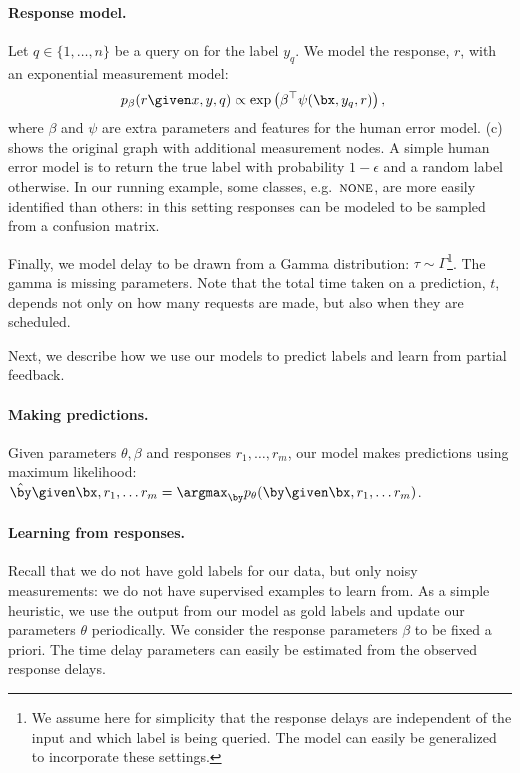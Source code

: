 \paragraph{Response model.}
Let $q \in \{1, \ldots, n\}$ be a query on for the label $y_q$.
We model the response, $r$, with an exponential measurement model:
\begin{align*}
  p_\beta(r \given x, y, q) 
  &\propto \exp \left( \beta^\top\psi(\bx, y_q, r) \right),
\end{align*}
where $\beta$ and $\psi$ are extra parameters and features for the human error model. 
(c) shows the original graph with additional measurement nodes.
A simple human error model is to return the true label with probability $1-\epsilon$ and a random label otherwise.
In our running example, some classes, e.g.\ $\textsc{none}$, are more easily identified than others: in this setting responses can be modeled to be sampled from a confusion matrix.

Finally, we model delay to be drawn from a Gamma distribution: $\tau \sim \Gamma$\footnote{We assume here for simplicity that the response delays are independent of the input and which label is being queried. The model can easily be generalized to incorporate these settings.}.
\ac{The gamma is missing parameters.}
Note that the total time taken on a prediction, $t$, depends not only on how many requests are made, but also when they are scheduled.

Next, we describe how we use our models to predict labels and learn from partial feedback.

\paragraph{Making predictions.}
Given parameters $\theta, \beta$ and responses $r_1, \ldots, r_m$, our model makes predictions using maximum likelihood:
$\byt \given \bx, r_1, \ldots r_m = \argmax_{\by} \p(\by \given \bx, r_1, \ldots r_m)$.

\paragraph{Learning from responses.}
Recall that we do not have gold labels for our data, but only noisy measurements: we do not have supervised examples to learn from. 
As a simple heuristic, we use the output from our model as gold labels and update our parameters $\theta$ periodically.  
We consider the response parameters $\beta$ to be fixed a priori.
The time delay parameters can easily be estimated from the observed response delays.

